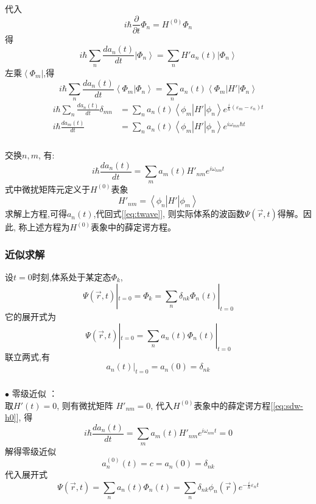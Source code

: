 \begin{frame} 
  \frametitle{}
代入 
\[i \hbar \frac{\partial }{\partial t} \Phi _n  = H^{(0)}\Phi _n  \]
得
\[ i \hbar \sum_n \frac{d a_n(t)}{d t} \left\vert \Phi _n  \right\rangle  = \sum_n H' a_n(t) \left\vert \Phi _n  \right\rangle \]
左乘$\left\langle \Phi _m  \right\vert$,得
\[ i \hbar \sum_n \frac{d a_n(t)}{d t} \left\langle \Phi _m \left\vert \Phi _n  \right\rangle\right.  = \sum_n a_n(t)\left\langle \Phi _m  \right\vert H'  \left\vert \Phi _n  \right\rangle \]
\[ \begin{aligned}
  i \hbar \sum_n \frac{d a_n(t)}{d t} \delta _{mn}  &= \sum_n a_n(t)\left\langle \phi _m  \right\vert H'  \left\vert \phi _n   \right\rangle e^{\frac{i}{\hbar}(\varepsilon _m -\varepsilon _n)t} \\ 
  i \hbar \frac{d a_m(t)}{d t}  &= \sum_n a_n(t)\left\langle \phi _m  \right\vert H'  \left\vert \phi _n   \right\rangle e^{i\omega _{mn}{\hbar}t} 
\end{aligned}\]
\end{frame} 

\begin{frame} 
  \frametitle{}
交换$n,m$, 有:
\begin{equation}\label{eq:sdw-h0}
\boxed{i \hbar \frac{d a_n(t)}{d t} = \sum_m a_m(t) H'_{nm}  e^{i \omega _{nm} t} }  
\end{equation}
式中微扰矩阵元定义于$H^{(0)}$表象
\[ H'_{nm} = \left\langle \phi _n  \right\vert H'  \left\vert \phi _m   \right\rangle \]
求解上方程,可得$a_n(t)$,代回式[\ref{eq:twave}], 则实际体系的波函数$\Psi(\vec{r},t)$得解。因此, 称上述方程为$H^{(0)}$表象中的薛定谔方程。
\end{frame} 

\begin{frame} 
  \frametitle{近似求解}
设$t=0$时刻,体系处于某定态$\Phi _k$, 
\begin{equation*}
  \Psi(\vec{r},t)|_{t=0} = \Phi _k = \sum_n \delta _{nk} \Phi _n(t)|_{t=0} 
\end{equation*}
它的展开式为
\begin{equation*}
  \Psi(\vec{r},t)|_{t=0} = \sum_n a_n(t)\Phi _n(t)|_{t=0} 
\end{equation*}
联立两式,有 
\[ a_n(t)|_{t=0} =a_n(0) = \delta _{nk} \]
\end{frame} 

\begin{frame} 
  \frametitle{}
$\bullet$ 零级近似 ：\\
取$H'(t)=0$, 则有微扰矩阵 $H'_{nm} =0$, 代入$H^{(0)}$表象中的薛定谔方程[\ref{eq:sdw-h0}], 得
\begin{equation*}
  i \hbar \frac{d a_n(t)}{d t} = \sum_m a_m(t) H'_{nm}  e^{i \omega _{nm} t} =0
  \end{equation*}
解得零级近似 
\[ a^{(0)}_n(t) = c = a_n(0) = \delta _{nk}\]
代入展开式
\begin{equation*}
  \Psi(\vec{r},t) = \sum_n a_n(t)\Phi _n(t) = \sum_n \delta _{nk}\phi _n(\vec{r})e^{-\frac{i}{\hbar}\varepsilon _n t} 
\end{equation*}
\end{frame} 

